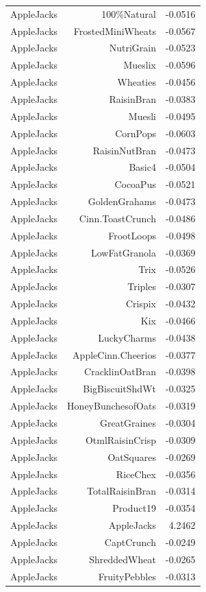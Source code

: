 \begin{longtable}{@{}lrr@{}}
AppleJacks & 100\%Natural & -0.0516 \\
AppleJacks & FrostedMiniWheats & -0.0567 \\
AppleJacks & NutriGrain & -0.0523 \\
AppleJacks & Mueslix & -0.0596 \\
AppleJacks & Wheaties & -0.0456 \\
AppleJacks & RaisinBran & -0.0383 \\
AppleJacks & Muesli & -0.0495 \\
AppleJacks & CornPops & -0.0603 \\
AppleJacks & RaisinNutBran & -0.0473 \\
AppleJacks & Basic4 & -0.0504 \\
AppleJacks & CocoaPus & -0.0521 \\
AppleJacks & GoldenGrahams & -0.0473 \\
AppleJacks & Cinn.ToastCrunch & -0.0486 \\
AppleJacks & FrootLoops & -0.0498 \\
AppleJacks & LowFatGranola & -0.0369 \\
AppleJacks & Trix & -0.0526 \\
AppleJacks & Triples & -0.0307 \\
AppleJacks & Crispix & -0.0432 \\
AppleJacks & Kix & -0.0466 \\
AppleJacks & LuckyCharms & -0.0438 \\
AppleJacks & AppleCinn.Cheerios & -0.0377 \\
AppleJacks & CracklinOatBran & -0.0398 \\
AppleJacks & BigBiscuitShdWt & -0.0325 \\
AppleJacks & HoneyBunchesofOats & -0.0319 \\
AppleJacks & GreatGraines & -0.0304 \\
AppleJacks & OtmlRaisinCrisp & -0.0309 \\
AppleJacks & OatSquares & -0.0269 \\
AppleJacks & RiceChex & -0.0356 \\
AppleJacks & TotalRaisinBran & -0.0314 \\
AppleJacks & Product19 & -0.0354 \\
AppleJacks & AppleJacks & 4.2462 \\
AppleJacks & CaptCrunch & -0.0249 \\
AppleJacks & ShreddedWheat & -0.0265 \\
AppleJacks & FruityPebbles & -0.0313 \\

\end{longtable}
